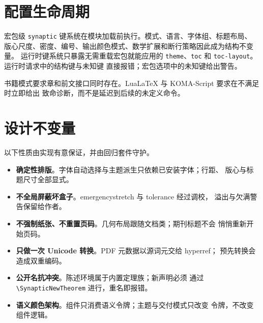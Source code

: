 \documentclass[a4paper,11pt]{scrartcl}
\begin{document}

\section{配置生命周期}

宏包级 \texttt{synaptic} 键系统在模块加载前执行。模式、语言、字体组、标题布局、
版心尺度、密度、编号、输出颜色模式、数学扩展和断行策略因此成为结构不变量。
运行时键系统只暴露无需重载宏包就能应用的
\texttt{theme}、\texttt{toc} 和 \texttt{toc-layout}。运行时请求中的结构键与未知键
直接报错；宏包选项中的未知键给出警告。

书籍模式要求章和前文接口同时存在。LuaLaTeX 与 KOMA-Script 要求在不满足时立即给出
致命诊断，而不是延迟到后续的未定义命令。

\section{设计不变量}

以下性质由实现有意保证，并由回归套件守护。

\begin{itemize}
  \item \textbf{确定性排版}。字体自动选择与主题派生只依赖已安装字体；行距、
    版心与标题尺寸全部显式。
  \item \textbf{不全局屏蔽坏盒子}。emergencystretch 与 tolerance 经过调校，
    溢出与欠满警告保留给作者。
  \item \textbf{不强制纸张、不重置页码}。几何布局跟随文档类；期刊标题不会
    悄悄重新开始页码。
  \item \textbf{只做一次 Unicode 转换}。PDF 元数据以源词元交给 hyperref；
    预先转换会造成双重编码。
  \item \textbf{公开名抗冲突}。陈述环境属于内置定理族；新声明必须
    通过 \verb|\SynapticNewTheorem| 进行，重名即报错。
  \item \textbf{语义颜色架构}。组件只消费语义令牌；主题与交付模式只改变
    令牌，不改变组件逻辑。
\end{itemize}
\end{document}
